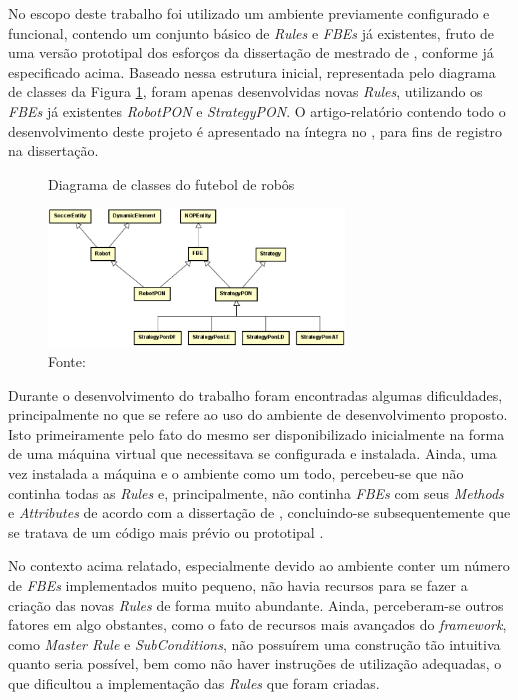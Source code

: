 No escopo deste trabalho foi utilizado um ambiente previamente configurado e
funcional, contendo um conjunto básico de \textit{Rules} e \textit{FBEs} já
existentes, fruto de uma versão prototipal dos esforços da dissertação de
mestrado de , conforme já especificado acima.
Baseado nessa estrutura inicial, representada pelo diagrama de classes da Figura
\ref{fig:class_futebol}, foram apenas desenvolvidas novas \textit{Rules},
utilizando os \textit{FBEs} já existentes \textit{RobotPON} e
\textit{StrategyPON}. O artigo-relatório contendo todo o desenvolvimento deste
projeto é apresentado na íntegra no , para fins de
registro na dissertação.

\begin{figure}[!htb]
    \centering
    \caption{Diagrama de classes do futebol de robôs}
    \includegraphics[width=0.7\textwidth]{../figures/class_futebol.png}
    \smallskip
    \caption*{Fonte: }
    \label{fig:class_futebol}
\end{figure}

\FloatBarrier

Durante o desenvolvimento do trabalho foram encontradas algumas dificuldades,
principalmente no que se refere ao uso do ambiente de desenvolvimento proposto.
Isto primeiramente pelo fato do mesmo ser disponibilizado inicialmente na forma
de uma máquina virtual que necessitava se configurada e instalada. Ainda, uma vez
instalada a máquina e o ambiente como um todo, percebeu-se que não continha
todas as \textit{Rules} e, principalmente, não continha \textit{FBEs} com seus
\textit{Methods} e \textit{Attributes} de acordo com a dissertação de
, concluindo-se subsequentemente que se tratava de
um código mais prévio ou prototipal \cite{lima_2020}.

No contexto acima relatado, especialmente devido ao ambiente conter um número de
\textit{FBEs} implementados muito pequeno, não havia recursos para se fazer a
criação das novas \textit{Rules} de forma muito abundante. Ainda, perceberam-se
outros fatores em algo obstantes, como o fato de recursos mais avançados do
\textit{framework}, como \textit{Master Rule} e \textit{SubConditions}, não
possuírem uma construção tão intuitiva quanto seria possível, bem como não haver
instruções de utilização adequadas, o que dificultou a implementação das
\textit{Rules} que foram criadas.

